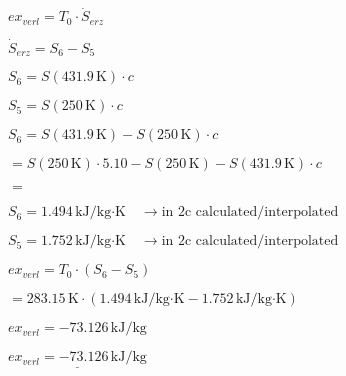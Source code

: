 \( ex_{verl} = T_0 \cdot \dot{S}_{erz} \)  

\( \dot{S}_{erz} = S_6 - S_5 \)  

\( S_6 = S(431.9 \, \text{K}) \cdot c \)  

\( S_5 = S(250 \, \text{K}) \cdot c \)  

\( S_6 = S(431.9 \, \text{K}) - S(250 \, \text{K}) \cdot c \)  

\( = S(250 \, \text{K}) \cdot 5.10 - S(250 \, \text{K}) - S(431.9 \, \text{K}) \cdot c \)  

\( = \)  

\( S_6 = 1.494 \, \text{kJ/kg·K} \quad \rightarrow \text{in 2c calculated/interpolated} \)  

\( S_5 = 1.752 \, \text{kJ/kg·K} \quad \rightarrow \text{in 2c calculated/interpolated} \)  

\( ex_{verl} = T_0 \cdot (S_6 - S_5) \)  

\( = 283.15 \, \text{K} \cdot (1.494 \, \text{kJ/kg·K} - 1.752 \, \text{kJ/kg·K}) \)  

\( ex_{verl} = -73.126 \, \text{kJ/kg} \)  

\( \underline{ex_{verl} = -73.126 \, \text{kJ/kg}} \)